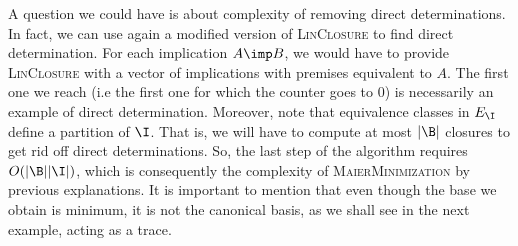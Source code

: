 A question we could have is about complexity of removing direct determinations.
In fact, we can use again a modified version of \textsc{LinClosure} to find
direct determination. For each implication $A \imp B$, we would have to 
provide \textsc{LinClosure} with a vector of implications with premises 
equivalent to $A$. The first one we reach (i.e the first one for which the 
counter goes to 0) is necessarily an example of direct determination. Moreover,
note that equivalence classes in $E_{\I}$ define a partition of $\I$. That is,
we will have to compute at most $|\B|$ closures to get rid off direct 
determinations. So, the last step of the algorithm requires $O(|\B||\I|)$,
which is consequently the complexity of \textsc{MaierMinimization} by 
previous explanations. It is important to mention that even though the base
we obtain is minimum, it is not the canonical basis, as we shall see in the
next example, acting as a trace.

\vspace{1.2em}

